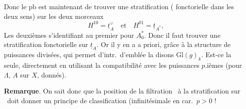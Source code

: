 \documentclass[11pt,a4paper]{article}
\begin{document}
Donc le pb est maintenant de trouver une stratification \struck{\ill{}}
( fonctorielle dans les deux sens) sur les deux
morceaux
\[
H^{10} = \underline{t}_A^{\vee} \quad \text{et} \quad H^{01} = \underline{t}_{A^*} ,
\]
Les deuxièmes  s'identifiant au premier pour
$A_0^*$.
Donc il faut trouver une stratification fonctorielle sur
$\underline{t}_A$. Or il y en a  a priori, grâce à la
structure de puissances divisées, qui
permet d'intr.\ d'emblée la 
  disons
$\mathrm{Gl}(g)_k$. Est-ce la seule,  
  directement en utilisant la
compatibilité avec les puissances $p$.ièmes (pour $\Lambda$, $A$ sur $X$,
donnés).

\textbf{Remarque}. On sait donc que la position de la filtration
\ à la stratification sur 
\ doit donner un
principe de classification (infinitésimale en car.\ $p > 0$
!

\end{document}
